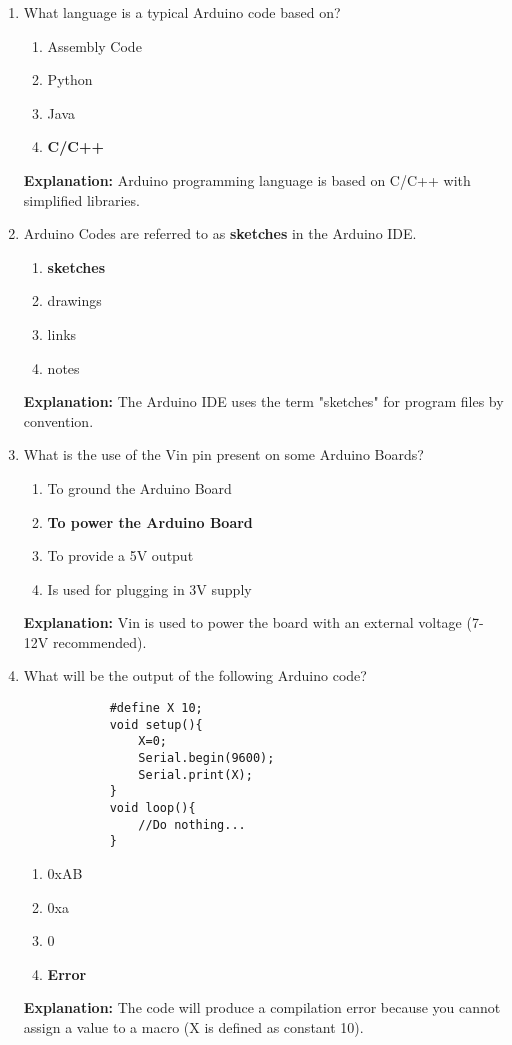 \documentclass[a4paper,12pt]{article}
\begin{document}
\begin{enumerate}
		\item What language is a typical Arduino code based on?
		\begin{enumerate}
			\item Assembly Code
			\item Python
			\item Java
			\item \textbf{C/C++}
		\end{enumerate}
		\textbf{Explanation:} Arduino programming language is based on C/C++ with simplified libraries.
		
		\item Arduino Codes are referred to as \textbf{sketches} in the Arduino IDE.
		\begin{enumerate}
			\item \textbf{sketches}
			\item drawings
			\item links
			\item notes
		\end{enumerate}
		\textbf{Explanation:} The Arduino IDE uses the term "sketches" for program files by convention.
		
		\item What is the use of the Vin pin present on some Arduino Boards?
		\begin{enumerate}
			\item To ground the Arduino Board
			\item \textbf{To power the Arduino Board}
			\item To provide a 5V output
			\item Is used for plugging in 3V supply
		\end{enumerate}
		\textbf{Explanation:} Vin is used to power the board with an external voltage (7-12V recommended).
		
		\item What will be the output of the following Arduino code?
		\begin{verbatim}
			#define X 10;
			void setup(){
				X=0;
				Serial.begin(9600);
				Serial.print(X);
			}
			void loop(){
				//Do nothing...
			}
		\end{verbatim}
		\begin{enumerate}
			\item 0xAB
			\item 0xa
			\item 0
			\item \textbf{Error}
		\end{enumerate}
		\textbf{Explanation:} The code will produce a compilation error because you cannot assign a value to a macro (X is defined as constant 10).
		

\end{enumerate}
\end{document}

